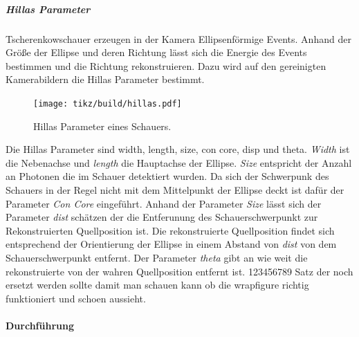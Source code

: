 \subparagraph{Hillas Parameter}%
\label{spar:hillas_parameter}

Tscherenkowschauer erzeugen in der Kamera Ellipsenförmige Events.
Anhand der Größe der Ellipse und deren Richtung lässt sich die Energie des
Events bestimmen und die Richtung rekonstruieren.
Dazu wird auf den gereinigten Kamerabildern die Hillas Parameter bestimmt.


\begin{figure}
  \centering
  \texttt{[image: tikz/build/hillas.pdf]}
  \caption{Hillas Parameter eines Schauers.}%
  \label{fig:hillas}
\end{figure}


Die Hillas Parameter sind width, length, size, con core, disp und theta.
\textit{Width} ist die Nebenachse und \textit{length} die Hauptachse der Ellipse. 
\textit{Size} entspricht der Anzahl an Photonen die im Schauer detektiert wurden.
Da sich der Schwerpunk des Schauers in der Regel nicht mit dem Mittelpunkt der
Ellipse deckt ist dafür der Parameter \textit{Con Core} eingeführt.
Anhand der Parameter \textit{Size} lässt sich der Parameter \textit{dist}
schätzen der die Entferunung des Schauerschwerpunkt zur Rekonstruierten
Quellposition ist.
Die rekonstruierte Quellposition findet sich entsprechend der Orientierung der
Ellipse in einem Abstand von \textit{dist} von dem Schauerschwerpunkt entfernt.
Der Parameter \textit{theta} gibt an wie weit die rekonstruierte von der wahren
Quellposition entfernt ist.
123456789 Satz der noch ersetzt werden sollte damit man schauen kann ob die wrapfigure
richtig funktioniert und schoen aussieht.

\paragraph{Durchführung}
